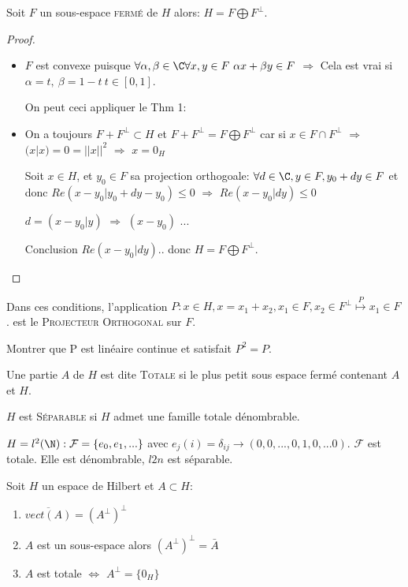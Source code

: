 \begin{theorem}[corollaire]
	Soit $F$ un sous-espace \textsc{fermé} de $H$ alors: $H=F\bigoplus F^\perp$.
\end{theorem}
\begin{proof}
	\begin{itemize}
		\item $F$ est convexe puisque $\forall \alpha,\beta\in\C \forall x, y\in F\ \alpha x+\beta y\in F$ $\Rightarrow$ Cela est vrai si $\alpha = t,\ \beta=1-t\ t\in[0,1]$.
	
	On peut ceci appliquer le Thm 1:
		\item On a toujours $F+F^\perp \subset H$ et $F+F^\perp = F\bigoplus F^\perp$ car si $x\in F\cap F^\perp$ $\Rightarrow$ $(x|x)=0=||x||^2$ $\Rightarrow$ $x=0_H$
		
		Soit $x\in H$, et $y_0\in F$ sa projection orthogoale: $\forall d\in \C, y\in F, y_0+dy\in F$ et donc $Re(x-y_0| y_0+dy-y_0)\leq 0$ $\Rightarrow$ $Re(x-y_0|dy)\leq 0$
		
		$d=(x-y_0|y)$ $\Rightarrow$ $(x-y_0)$
		...
		
	Conclusion $Re(x-y_0|dy)$.. donc $H=F\bigoplus F^\perp$.
	\end{itemize}
\end{proof}

\begin{definition}
	Dans ces conditions, l'application $P:x\in H, x=x_1+x_2, x_1\in F, x_2\in F^\perp \overset{P}{\mapsto} x_1\in F$. est le \textsc{Projecteur Orthogonal} sur $F$.
\end{definition}

\begin{examplebox}
	Montrer que P est linéaire continue et satisfait $P^2=P$.
\end{examplebox}

\begin{definition}
	Une partie $A$ de $H$ est dite \textsc{Totale} si le plus petit sous espace fermé contenant $A$ et $H$.

	$H$ est \textsc{Séparable} si $H$ admet une famille totale dénombrable.
\end{definition}

\begin{example}
	$H=l^2(\N): \mathcal{F}=\{e_0, e_1, ...\}$ avec $e_j(i)=\delta_{ij}\to (0,0,..., 0,1,0,... 0)$. $\mathcal{F}$ est totale. Elle est dénombrable, $l2n$ est séparable.
\end{example}

\begin{theorem}
	Soit $H$ un espace de Hilbert et $A\subset H$:
	\begin{enumerate}
		\item $\overline{vect(A)}=(A^\perp)^\perp$
		\item $A$ est un sous-espace alors $(A^\perp)^\perp=\bar A$
		\item $A$ est totale $\Leftrightarrow$ $A^\perp=\{0_H\}$
	\end{enumerate}
\end{theorem}

